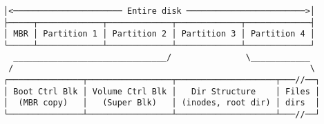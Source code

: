\documentclass[varwidth=50em,crop]{standalone}
\begin{document}
\begin{verbatim}
│<────────────────────── Entire disk ────────────────────────>│
├─────┬─────────────┬─────────────┬─────────────┬─────────────┤
│ MBR │ Partition 1 │ Partition 2 │ Partition 3 │ Partition 4 │
└─────┴─────────────┴─────────────┴─────────────┴─────────────┘
  _______________________________/               \____________
 /                                                            \
┌───────────────┬─────────────────┬────────────────────┬───//──┐
│ Boot Ctrl Blk │ Volume Ctrl Blk │   Dir Structure    │ Files │
│  (MBR copy)   │   (Super Blk)   │ (inodes, root dir) │ dirs  │
└───────────────┴─────────────────┴────────────────────┴───//──┘
\end{verbatim}
\end{document}
